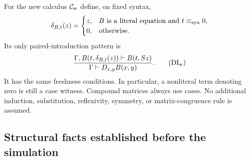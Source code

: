 \documentclass[11pt,letterpaper]{article}
\theoremstyle{definition}\newtheorem{definition}[theorem]{Definition}
\theoremstyle{remark}\newtheorem{remark}[theorem]{Remark}
\begin{document}
For the new calculus $\mathcal C_{\rm w}$ define, on fixed syntax,
\[
 \delta_{B,t}(z)=
 \begin{cases}
 z,& B\text{ is a literal equation and }t\equiv_{\rm syn}0,\\
 0,&\text{otherwise}.
 \end{cases}
\]
Its only paired-introduction pattern is
\[
 \frac{\Gamma,B(t,\delta_{B,t}(z))\vdash B(t,Sz)}
      {\Gamma\vdash D_{x,y}B(x,y)}.
 \tag{DI$_{\rm w}$}\label{eq:det-witness-intro}
\]
It has the same freshness conditions.  In particular, a nonliteral
term denoting zero is still a case witness.  Compound matrices always
use cases.  No additional induction, substitution, reflexivity, symmetry,
or matrix-congruence rule is assumed.

\subsection{Structural facts established before the simulation}
\end{document}
